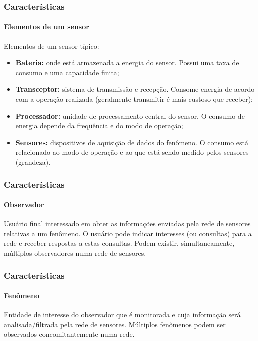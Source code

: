 \documentclass[notes]{beamer}
\begin{document}
\begin{frame}
\frametitle{Características}
\framesubtitle{Elementos de um sensor}

\begin{block}

Elementos de um sensor típico:

\begin{itemize}

\item \textbf{Bateria:} onde está armazenada a energia do sensor. Possui uma taxa de consumo e uma capacidade finita; \pause

\item \textbf{Transceptor:} sistema de transmissão e recepção. Consome energia de acordo com a operação realizada (geralmente transmitir é mais custoso que receber); \pause

\item \textbf{Processador:} unidade de processamento central do sensor. O consumo de energia depende da freqüência e do modo de operação; \pause

\item \textbf{Sensores:} dispositivos de aquisição de dados do fenômeno. O consumo está relacionado ao modo de operação e ao que está sendo medido pelos sensores (grandeza). 

\end{itemize}

\end{block}

\end{frame}

\begin{frame}
\frametitle{Características}
\framesubtitle{Observador}

\begin{block}

Usuário final interessado em obter
as informações enviadas pela rede de sensores relativas a um fenômeno. O usuário pode indicar interesses (ou consultas) para a rede e receber respostas a estas
consultas. Podem existir, simultaneamente,
múltiplos observadores numa rede de sensores.
\end{block}

\end{frame}

\begin{frame}
\frametitle{Características}
\framesubtitle{Fenômeno}

\begin{block}

Entidade de interesse do observador que é monitorada e cuja
informação será analisada/filtrada pela rede de sensores. Múltiplos fenômenos
podem ser observados concomitantemente numa rede.

\end{block}

\end{frame}
\end{document}

